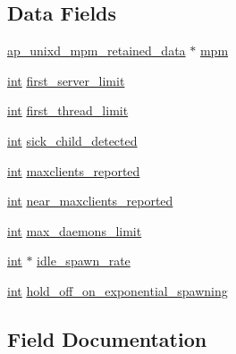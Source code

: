 \subsection*{Data Fields}
\begin{DoxyCompactItemize}
\item 
\hyperlink{structap__unixd__mpm__retained__data}{ap\+\_\+unixd\+\_\+mpm\+\_\+retained\+\_\+data} $\ast$ \hyperlink{structworker__retained__data_a2e40ea64c098ee732422279fd7384c5b}{mpm}
\item 
\hyperlink{pcre_8txt_a42dfa4ff673c82d8efe7144098fbc198}{int} \hyperlink{structworker__retained__data_a74967c53237c3af029dc96bc60648dc9}{first\+\_\+server\+\_\+limit}
\item 
\hyperlink{pcre_8txt_a42dfa4ff673c82d8efe7144098fbc198}{int} \hyperlink{structworker__retained__data_aed06fac591920819be957d519eda1d83}{first\+\_\+thread\+\_\+limit}
\item 
\hyperlink{pcre_8txt_a42dfa4ff673c82d8efe7144098fbc198}{int} \hyperlink{structworker__retained__data_a5c8df45aeb343a3c4857c07702730b4a}{sick\+\_\+child\+\_\+detected}
\item 
\hyperlink{pcre_8txt_a42dfa4ff673c82d8efe7144098fbc198}{int} \hyperlink{structworker__retained__data_a1080a8cf7dec0614cda7c030fc0b9ece}{maxclients\+\_\+reported}
\item 
\hyperlink{pcre_8txt_a42dfa4ff673c82d8efe7144098fbc198}{int} \hyperlink{structworker__retained__data_a7999b3f233ba7907e7bbb7452b653a31}{near\+\_\+maxclients\+\_\+reported}
\item 
\hyperlink{pcre_8txt_a42dfa4ff673c82d8efe7144098fbc198}{int} \hyperlink{structworker__retained__data_a7917b0f8df8cd75193cf8c50f010784b}{max\+\_\+daemons\+\_\+limit}
\item 
\hyperlink{pcre_8txt_a42dfa4ff673c82d8efe7144098fbc198}{int} $\ast$ \hyperlink{structworker__retained__data_a2404ebf90d908a4659c0022312143e0a}{idle\+\_\+spawn\+\_\+rate}
\item 
\hyperlink{pcre_8txt_a42dfa4ff673c82d8efe7144098fbc198}{int} \hyperlink{structworker__retained__data_a785acdb61ee917b8e006b99815d8f561}{hold\+\_\+off\+\_\+on\+\_\+exponential\+\_\+spawning}
\end{DoxyCompactItemize}


\subsection{Field Documentation}
